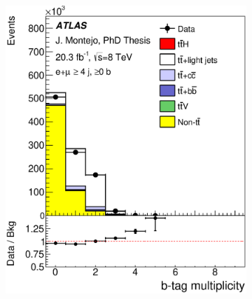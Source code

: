 \begin{figure}[tp!]
  \centering
  \begin{subfigure}{0.32\textwidth}
  \includegraphics[width=\textwidth]{Modeling/Figures/plots_4j0b/bjet_n_ELEMUON_4jetin0btagin_NOMINAL.eps}
  \caption{}\label{fig:bjet_n_4j0b} \end{subfigure}
  \begin{subfigure}{0.32\textwidth}

\end{subfigure}
\end{figure}
